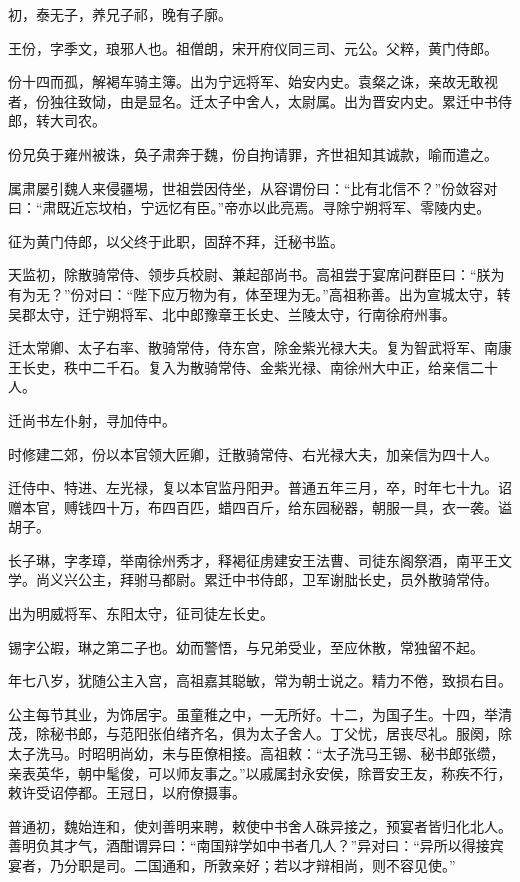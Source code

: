 \documentclass[12pt,UTF8]{ctexbook}
\begin{document}
初，泰无子，养兄子祁，晚有子廓。

王份，字季文，琅邪人也。祖僧朗，宋开府仪同三司、元公。父粹，黄门侍郎。

份十四而孤，解褐车骑主簿。出为宁远将军、始安内史。袁粲之诛，亲故无敢视者，份独往致恸，由是显名。迁太子中舍人，太尉属。出为晋安内史。累迁中书侍郎，转大司农。

份兄奂于雍州被诛，奂子肃奔于魏，份自拘请罪，齐世祖知其诚款，喻而遣之。

属肃屡引魏人来侵疆埸，世祖尝因侍坐，从容谓份曰：“比有北信不？”份敛容对曰：“肃既近忘坟柏，宁远忆有臣。”帝亦以此亮焉。寻除宁朔将军、零陵内史。

征为黄门侍郎，以父终于此职，固辞不拜，迁秘书监。

天监初，除散骑常侍、领步兵校尉、兼起部尚书。高祖尝于宴席问群臣曰：“朕为有为无？”份对曰：“陛下应万物为有，体至理为无。”高祖称善。出为宣城太守，转吴郡太守，迁宁朔将军、北中郎豫章王长史、兰陵太守，行南徐府州事。

迁太常卿、太子右率、散骑常侍，侍东宫，除金紫光禄大夫。复为智武将军、南康王长史，秩中二千石。复入为散骑常侍、金紫光禄、南徐州大中正，给亲信二十人。

迁尚书左仆射，寻加侍中。

时修建二郊，份以本官领大匠卿，迁散骑常侍、右光禄大夫，加亲信为四十人。

迁侍中、特进、左光禄，复以本官监丹阳尹。普通五年三月，卒，时年七十九。诏赠本官，赙钱四十万，布四百匹，蜡四百斤，给东园秘器，朝服一具，衣一袭。谥胡子。

长子琳，字孝璋，举南徐州秀才，释褐征虏建安王法曹、司徒东阁祭酒，南平王文学。尚义兴公主，拜驸马都尉。累迁中书侍郎，卫军谢朏长史，员外散骑常侍。

出为明威将军、东阳太守，征司徒左长史。

锡字公嘏，琳之第二子也。幼而警悟，与兄弟受业，至应休散，常独留不起。

年七八岁，犹随公主入宫，高祖嘉其聪敏，常为朝士说之。精力不倦，致损右目。

公主每节其业，为饰居宇。虽童稚之中，一无所好。十二，为国子生。十四，举清茂，除秘书郎，与范阳张伯绪齐名，俱为太子舍人。丁父忧，居丧尽礼。服阕，除太子洗马。时昭明尚幼，未与臣僚相接。高祖敕：“太子洗马王锡、秘书郎张缵，亲表英华，朝中髦俊，可以师友事之。”以戚属封永安侯，除晋安王友，称疾不行，敕许受诏停都。王冠日，以府僚摄事。

普通初，魏始连和，使刘善明来聘，敕使中书舍人硃异接之，预宴者皆归化北人。善明负其才气，酒酣谓异曰：“南国辩学如中书者几人？”异对曰：“异所以得接宾宴者，乃分职是司。二国通和，所敦亲好；若以才辩相尚，则不容见使。”
\end{document}
